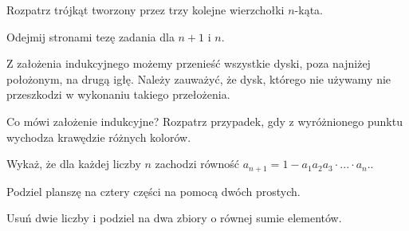 \newpage
{}

\begin{hints_list}

	\item Rozpatrz trójkąt tworzony przez trzy kolejne wierzchołki $n$-kąta.

	\item Odejmij stronami tezę zadania dla $n + 1$ i $n$.

	\item
	Z założenia indukcyjnego możemy przenieść wszystkie dyski, poza najniżej położonym, na drugą igłę. Należy zauważyć, że dysk, którego nie używamy nie przeszkodzi w wykonaniu takiego przełożenia.

	\item Co mówi założenie indukcyjne? Rozpatrz przypadek, gdy z wyróżnionego punktu wychodza krawędzie różnych kolorów.

	\item Wykaż, że dla każdej liczby $n$ zachodzi równość $a_{n + 1} = 1 - a_1a_2a_3\cdot ... \cdot a_{n}.$.

	\item Podziel planszę na cztery części na pomocą dwóch prostych.

	\item Usuń dwie liczby i podziel na dwa zbiory o równej sumie elementów.
\end{hints_list}